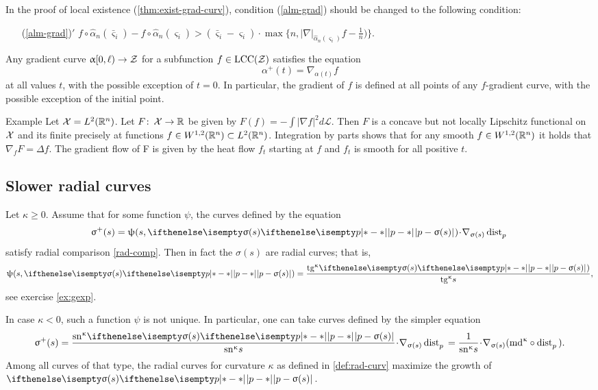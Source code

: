 \medskip

In the proof of local existence (\ref{thm:exist-grad-curv}), condition (\ref{alm-grad})
should be changed to the following condition:
\begin{itemize}

\item[{(\ref{alm-grad})}$'$]
$f\circ\hat\alpha_n(\bar\varsigma_i)-f\circ\hat\alpha_n(\varsigma_i)
>
(\bar\varsigma_i-\varsigma_i)
\cdot
\max\{n,|\nabla|_{\hat\alpha_n(\varsigma_i)}f-\tfrac{1}{n})\}.$
\end{itemize}

Any gradient curve $\alpha[0,\ell)\to\spc{Z}$
for a subfunction
$f\in \LSCSC(\spc{Z})$
satisfies the equation
\[\alpha^+(t)=\nabla_{\alpha(t)} f\]
at all values $t$, with the possible exception of $t=0$.
In particular, the gradient of $f$ is defined at all points of any 
$f$-gradient curve, with the possible exception of the initial point.

\begin{thm}{Example}
Let $\mathcal{X}=L^2(\mathbb{R}^n)$. Let $F\co \spc{X}\to \R$ be given  by $F(f)=-\int|\nabla f|^2d\mathcal L$.
Then $F$ is a concave but not locally Lipschitz functional on $\mathcal{X}$ and its finite precisely at functions $f\in W^{1,2}(\R^n)\subset L^2(\R^n)$.
Integration by parts shows that for any smooth $f\in W^{1,2}(\R^n)$ it holds that $\nabla_fF=\Delta f$.
The gradient flow of F is given by the heat flow $f_t$ starting at $f$ and $f_t$ is smooth for all positive $t$.
\end{thm}

\subsection*{Slower radial curves}
Let $\kappa\ge 0$. 
Assume that for some function $\psi$, the curves defined by the equation 
\[\sigma^+(s)=\psi(s,\dist{p}{\sigma(s)}{})\cdot\nabla_{\sigma(s)}\distfun{p}{}{}\]
satisfy radial comparison \ref{rad-comp}.
Then in fact the $\sigma(s)$ are radial curves; 
that is, 
\[\psi(s,\dist{p}{\sigma(s)}{})= \frac{\tang\kappa\dist[{{}}]{p}{\sigma(s)}{})}{\tang\kappa s},\]
see exercise \ref{ex:gexp}.

In case $\kappa<0$, such a function $\psi$ is not unique.
In particular, one can take curves defined by the simpler equation
\[\sigma^+(s)
=
\frac{\sn\kappa \dist[{{}}]{p}{\sigma(s)}{}}{\sn\kappa s}\cdot\nabla_{\sigma(s)}\distfun{p}{}{}
=
\frac{1}{\sn\kappa s}\cdot\nabla_{\sigma(s)}(\md\kappa\circ\distfun{p}{}{}).\]
Among all curves of that type, the radial curves for curvature $\kappa$ 
as defined in \ref{def:rad-curv} maximize the growth of $\dist{p}{\sigma(s)}{}$.




